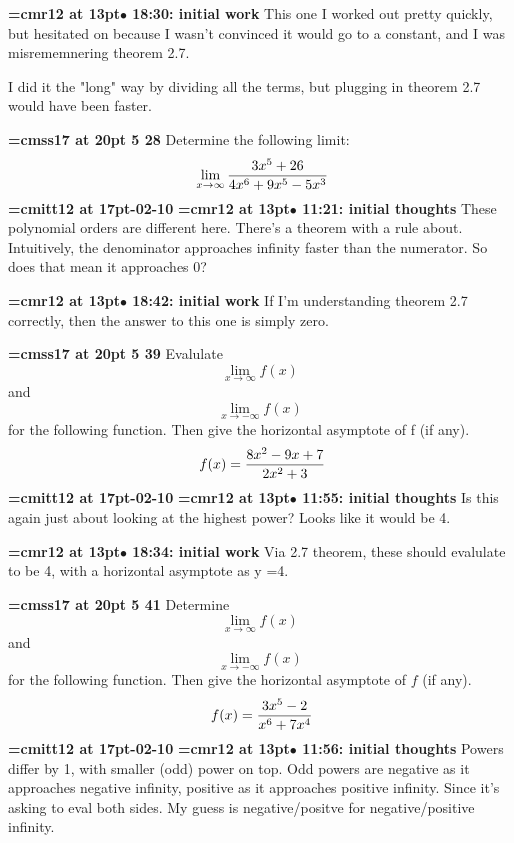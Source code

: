 {\smallskip\noindent\bf\font\titlefont=cmr12 at 13pt\titlefont $\bullet$ 18:30: initial work}\smallskip
This one I worked out pretty quickly, but hesitated on because I wasn't convinced it would go to a constant, and I was misrememnering theorem 2.7.
\par

I did it the "long" way by dividing all the terms, but plugging in theorem 2.7 would have been faster.
\par

{\medskip\noindent\bf\font\titlefont=cmss17 at 20pt 5 28}\medskip
Determine the following limit:
$$\
\lim_{x \to \infty} {
3x^5 + 26
\over
4x^6 + 9x^5 - 5x^3
}
$$
{\medskip\noindent\bf\font\titlefont=cmitt12 at 17pt-02-10}\medskip
{\smallskip\noindent\bf\font\titlefont=cmr12 at 13pt\titlefont $\bullet$ 11:21: initial thoughts}\smallskip
These polynomial orders are different here. There's a theorem with a rule about. Intuitively, the denominator approaches infinity faster than the numerator. So does that mean it approaches 0?
\par

{\smallskip\noindent\bf\font\titlefont=cmr12 at 13pt\titlefont $\bullet$ 18:42: initial work}\smallskip
If I'm understanding theorem 2.7 correctly, then the answer to this one is simply zero.
\par

{\medskip\noindent\bf\font\titlefont=cmss17 at 20pt 5 39}\medskip
Evalulate
$$\lim_{x \to \infty}{f(x)}$$
and
$$\lim_{x \to -\infty}{f(x)}$$
for the following function. Then give the
horizontal asymptote of f (if any).
$$\
f(x) = {
8x^2 - 9x + 7
\over
2x^2 + 3
}
$$
{\medskip\noindent\bf\font\titlefont=cmitt12 at 17pt-02-10}\medskip
{\smallskip\noindent\bf\font\titlefont=cmr12 at 13pt\titlefont $\bullet$ 11:55: initial thoughts}\smallskip
Is this again just about looking at the highest power? Looks like it would be 4.
\par

{\smallskip\noindent\bf\font\titlefont=cmr12 at 13pt\titlefont $\bullet$ 18:34: initial work}\smallskip
Via 2.7 theorem, these should evalulate to be 4, with a horizontal asymptote as y =4.
\par

{\medskip\noindent\bf\font\titlefont=cmss17 at 20pt 5 41}\medskip
Determine
$$\lim_{x \to \infty}{f(x)}$$
and
$$\lim_{x \to -\infty}{f(x)}$$
for the following function. Then give the
horizontal asymptote of $f$ (if any).
$$\
f(x) = {
3x^5 - 2
\over
x^6 + 7x^4
}
$$
{\medskip\noindent\bf\font\titlefont=cmitt12 at 17pt-02-10}\medskip
{\smallskip\noindent\bf\font\titlefont=cmr12 at 13pt\titlefont $\bullet$ 11:56: initial thoughts}\smallskip
Powers differ by 1, with smaller (odd) power on top. Odd powers are negative as it approaches negative infinity, positive as it approaches positive infinity. Since it's asking to eval both sides. My guess is negative/positve for negative/positive infinity.
\par

